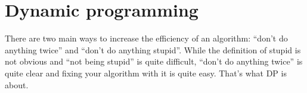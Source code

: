 \section{Dynamic programming}

There are two main ways to increase the efficiency of an algorithm:
``don't do anything twice'' and ``don't do anything stupid''.
While the definition of stupid is not obvious and
``not being stupid'' is quite difficult,
``don't do anything twice'' is quite clear and fixing your algorithm
with it is quite easy. That's what DP is about.








